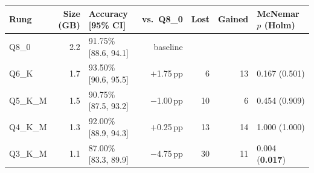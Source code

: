 \begin{tabular}{@{}lrlrrrl@{}}
\toprule
Rung & Size (GB) & Accuracy [95\% CI] & vs.\ Q8\_0 & Lost & Gained & McNemar $p$ (Holm) \\
\midrule
Q8\_0 & 2.2 & 91.75\% [88.6, 94.1] & baseline & & & \\
Q6\_K & 1.7 & 93.50\% [90.6, 95.5] & $+$1.75\,pp & 6 & 13 & 0.167 (0.501) \\
Q5\_K\_M & 1.5 & 90.75\% [87.5, 93.2] & $-$1.00\,pp & 10 & 6 & 0.454 (0.909) \\
Q4\_K\_M & 1.3 & 92.00\% [88.9, 94.3] & $+$0.25\,pp & 13 & 14 & 1.000 (1.000) \\
Q3\_K\_M & 1.1 & 87.00\% [83.3, 89.9] & $-$4.75\,pp & 30 & 11 & 0.004 (\textbf{0.017}) \\
\bottomrule
\end{tabular}
